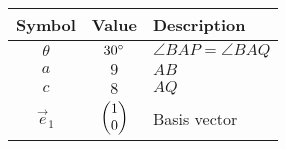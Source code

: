 \begin{tabular}{|c|c|p{5cm}|}
\hline
\textbf{Symbol} & \textbf{Value} & \textbf{Description} \\
\hline
$\theta$ & $30\degree$ & $\angle{BAP} = \angle{BAQ}$ \\
\hline
$a$ & $9$ & $AB$ \\
\hline
$c$ & $8$ & $AQ$ \\
\hline
$\vec{e}_1$ & $\begin{pmatrix}1\\0\end{pmatrix}$ & Basis vector \\
\hline
\end{tabular}
